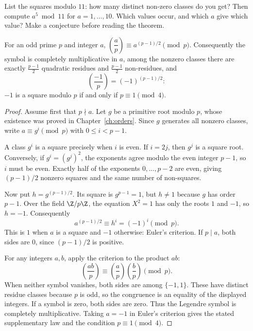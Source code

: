 \begin{think}
List the squares modulo $11$: how many distinct non-zero classes do you get? Then compute $a^5\bmod11$ for $a=1,\dots,10$. Which values occur, and which $a$ give which value? Make a conjecture before reading the theorem.
\end{think}

\begin{theorem}\label{thm:eulercrit}
For an odd prime $p$ and integer $a$,
$\left(\dfrac ap\right)\equiv a^{(p-1)/2}\pmod p$. Consequently the symbol is completely multiplicative in $a$, among the nonzero classes there are exactly $\frac{p-1}2$ quadratic residues and $\frac{p-1}2$ non-residues, and
\[
\left(\frac{-1}p\right)=(-1)^{(p-1)/2}:
\]
$-1$ is a square modulo $p$ if and only if $p\equiv1\pmod4$.
\end{theorem}
\begin{proof}
Assume first that $p\nmid a$.
Let $g$ be a primitive root modulo $p$,
whose existence was proved in
Chapter~\ref{ch:orders}. Since $g$ generates
all nonzero classes, write
$a\equiv g^i\pmod p$ with $0\le i<p-1$.

A class $g^i$ is a square precisely when
$i$ is even. If $i=2j$, then $g^j$
is a square root. Conversely, if
$g^i=(g^j)^2$, the exponents agree
modulo the even integer $p-1$, so
$i$ must be even. Exactly half of the
exponents $0,\ldots,p-2$ are even,
giving $(p-1)/2$ nonzero squares
and the same number of non-squares.

Now put $h=g^{(p-1)/2}$.
Its square is $g^{p-1}=1$, but $h\ne1$
because $g$ has order $p-1$.
Over the field $\Z/p\Z$, the equation
$X^2=1$ has only the roots $1$ and $-1$,
so $h=-1$. Consequently
\[
a^{(p-1)/2}\equiv h^i=(-1)^i\pmod p.
\]
This is $1$ when $a$ is a square and
$-1$ otherwise: Euler's criterion.
If $p\mid a$, both sides are $0$,
since $(p-1)/2$ is positive.

For any integers $a,b$, apply the criterion
to the product $ab$:
\[
\left(\frac{ab}{p}\right)
\equiv
\left(\frac ap\right)\left(\frac bp\right)
\pmod p.
\]
When neither symbol vanishes,
both sides are among $\{-1,1\}$.
These have distinct residue classes
because $p$ is odd, so the congruence
is an equality of the displayed integers.
If a symbol is zero, both sides are zero.
Thus the Legendre symbol is completely
multiplicative. Taking $a=-1$ in Euler's
criterion gives the stated supplementary
law and the condition $p\equiv1\pmod4$.
\end{proof}

